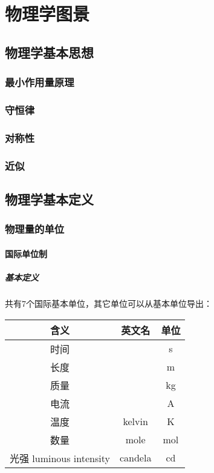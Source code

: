 \chapter{物理学图景}
\section{物理学基本思想}
\subsection{最小作用量原理}

\subsection{守恒律}

\subsection{对称性}

\subsection{近似}

\section{物理学基本定义}
\subsection{物理量的单位}
\subsubsection{国际单位制}
\paragraph*{基本定义}
共有7个国际基本单位，其它单位可以从基本单位导出：

\begin{longtable}{ccc}
	\toprule
	含义 &   英文名   &      单位       \\ 
	\midrule
	时间 &         &    \si{\s}    \\
	长度 &         &    \si{\m}    \\
	质量 &         &   \si{\kg}    \\
	电流 &         &    \si{\A}    \\
	温度 & kelvin  &    \si{\K}    \\
	数量 &  mole   &   \si{\mol}   \\
	光强 luminous intensity& candela & \si{\candela} \\ 
	\bottomrule
\end{longtable}
